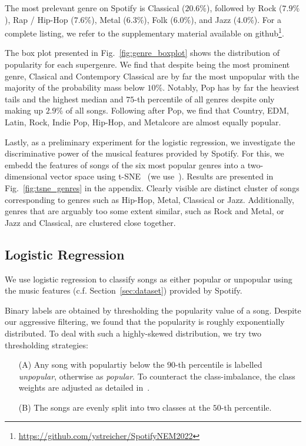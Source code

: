 \documentclass{article}
\begin{document}
The most prelevant genre on Spotify is Classical ($20.6\%$), followed by Rock ($7.9\%$), Rap / Hip-Hop ($7.6\%$), Metal ($6.3\%$), Folk ($6.0\%$), and Jazz ($4.0\%$). For a complete listing, we refer to the supplementary material available on github\footnote{\url{https://github.com/ystreicher/SpotifyNEM2022}}.

The box plot presented in Fig.~\ref{fig:genre_boxplot} shows the distribution of popularity for each supergenre. We find that despite  being the most prominent genre, Clasical and Contempory Classical are by far the most unpopular with the majority of the probability mass below $10\%$. Notably, Pop has by far the heaviest tails and the highest median and $75$-th percentile of all genres despite only making up $2.9\%$ of all songs. Following after Pop, we find that Country, EDM, Latin, Rock, Indie Pop, Hip-Hop, and Metalcore are almost equally popular.

Lastly, as a preliminary experiment for the logistic regression, we investigate the discriminative power of the musical features provided by Spotify. For this, we embedd the features of songs of the six most popular genres into a two-dimensional vector space using t-SNE~\cite{van2008visualizing} (we use~\cite{Policar731877}). Results are presented in Fig.~\ref{fig:tsne_genres} in the appendix. Clearly visible are distinct cluster of songs corresponding to genres such as Hip-Hop, Metal, Classical or Jazz. Additionally, genres that are arguably too some extent similar, such as Rock and Metal, or Jazz and Classical, are clustered close together.

\subsection{Logistic Regression}
We use logistic regression to classify songs as either popular or unpopular using the music features (c.f. Section~\ref{sec:dataset}) provided by Spotify. 

Binary labels are obtained by thresholding the popularity value of a song. Despite our aggressive filtering, we found that the popularity is roughly exponentially distributed. To deal with such a highly-skewed distribution, we try two thresholding strategies:
\begin{enumerate}
  \item[(A)] Any song with populartiy below the $90$-th percentile is labelled \emph{unpopular}, otherwise as \emph{popular}. To counteract the class-imbalance, the class weights are adjusted as detailed in~\cite{haixiangLearningClassimbalancedData2017a}.
  \item[(B)] The songs are evenly split into two classes at the $50$-th percentile.
\end{enumerate}
\end{document}

